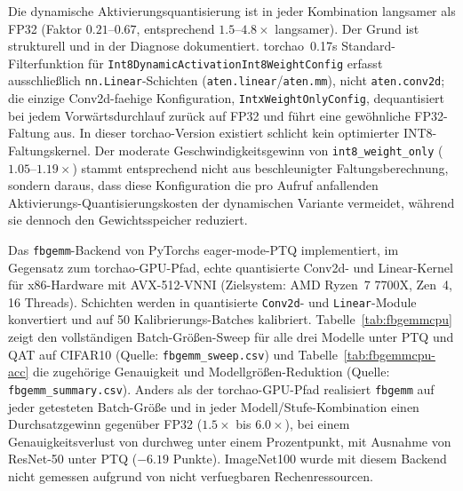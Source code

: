 Die dynamische Aktivierungsquantisierung ist in jeder Kombination langsamer als FP32 (Faktor $0.21$--$0.67$, entsprechend $1.5$--$4.8\times$ langsamer). Der Grund ist strukturell und in der Diagnose dokumentiert. torchao~0.17s Standard-Filterfunktion für \texttt{Int8DynamicActivationInt8WeightConfig} erfasst ausschließlich \texttt{nn.Linear}-Schichten (\texttt{aten.linear}/\texttt{aten.mm}), nicht \texttt{aten.conv2d}; die einzige Conv2d-faehige Konfiguration, \texttt{IntxWeightOnlyConfig}, dequantisiert bei jedem Vorwärtsdurchlauf zurück auf FP32 und führt eine gewöhnliche FP32-Faltung aus. In dieser torchao-Version existiert schlicht kein optimierter INT8-Faltungskernel. Der moderate Geschwindigkeitsgewinn von \texttt{int8\_weight\_only} ($1.05$--$1.19\times$) stammt entsprechend nicht aus beschleunigter Faltungsberechnung, sondern daraus, dass diese Konfiguration die pro Aufruf anfallenden Aktivierungs-Quantisierungskosten der dynamischen Variante vermeidet, während sie dennoch den Gewichtsspeicher reduziert.
\par\medskip

Das \texttt{fbgemm}-Backend von PyTorchs eager-mode-PTQ implementiert, im Gegensatz zum torchao-GPU-Pfad, echte quantisierte Conv2d- und Linear-Kernel für x86-Hardware mit AVX-512-VNNI (Zielsystem: AMD Ryzen~7 7700X, Zen~4, 16 Threads). Schichten werden in quantisierte \texttt{Conv2d}- und \texttt{Linear}-Module konvertiert und auf 50 Kalibrierungs-Batches kalibriert. Tabelle~\ref{tab:fbgemmcpu} zeigt den vollständigen Batch-Größen-Sweep für alle drei Modelle unter PTQ und QAT auf CIFAR10 (Quelle: \texttt{fbgemm\_sweep.csv}) und Tabelle~\ref{tab:fbgemmcpu-acc} die zugehörige Genauigkeit und Modellgrößen-Reduktion (Quelle: \texttt{fbgemm\_summary.csv}). Anders als der torchao-GPU-Pfad realisiert \texttt{fbgemm} auf jeder getesteten Batch-Größe und in jeder Modell/Stufe-Kombination einen Durchsatzgewinn gegenüber FP32 ($1.5\times$ bis $6.0\times$), bei einem Genauigkeitsverlust von durchweg unter einem Prozentpunkt, mit Ausnahme von ResNet-50 unter PTQ ($-6.19$ Punkte). ImageNet100 wurde mit diesem Backend nicht gemessen aufgrund von nicht verfuegbaren Rechenressourcen.
\par\medskip

